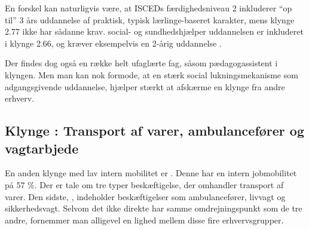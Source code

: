 En forskel kan naturligvis være, at ISCEDs færdighedsniveau 2 inkluderer “op til” 3 års uddannelse af praktisk, typisk lærlinge-baseret karakter, mens klynge 2.77 ikke har sådanne krav. social- og sundhedshjælper uddannelsen er inkluderet i klynge 2.66, og kræver eksempelvis en 2-årig uddannelse \parencite{Undervisningsministeriet2016}. 

Der findes dog også en række helt ufaglærte fag, såsom pædagogassistent i klyngen. Men man kan nok formode, at en stærk social lukningsmekanisme som adgangsgivende uddannelse, hjælper stærkt at afskærme en klynge fra andre erhverv.  








%



\subsection{Klynge : Transport af varer, ambulancefører og vagtarbjede}

En anden klynge  med lav intern mobilitet er . Denne har en intern jobmobilitet på 57 \%. Der er tale om tre typer beskæftigelse, der omhandler transport af varer. Den sidste, , indeholder beskæftigelser som ambulancefører, livvagt og sikkerhedsvagt. Selvom det ikke direkte har samme omdrejningspunkt som de tre andre, fornemmer man alligevel en lighed mellem disse fire erhvervsgrupper.


